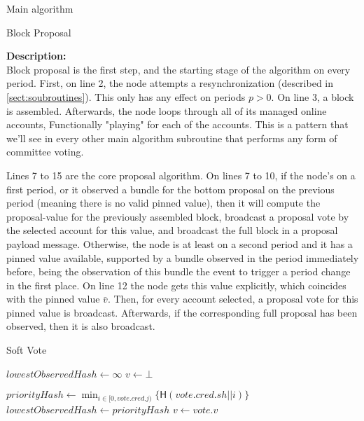 \documentclass[10pt,a4paper]{article}
\begin{document}
\begin{section}{Main algorithm}
\begin{subsection}{Block Proposal}
\newpage

\noindent \textbf{Description:}\\
Block proposal is the first step, and the starting stage of the algorithm on every period.
First, on line 2, the node attempts a resynchronization (described in \ref{sect:soubroutines}). 
This only has any effect on periods $p > 0$. On line 3, a block is assembled.
Afterwards, the node loops through all of its managed online accounts, Functionally
"playing" for each of the accounts. This is a pattern that we'll see in every other
main algorithm subroutine that performs any form of committee voting.

Lines 7 to 15 are the core proposal algorithm. On lines 7 to 10, 
if the node's on a first period, or it observed a bundle for the bottom proposal on the previous 
period (meaning there is no valid pinned value), then it will compute the proposal-value for the 
previously assembled block, broadcast a proposal vote by the selected account for this value, and 
broadcast the full block in a proposal payload message.
Otherwise, the node is at least on a second period and it has a pinned value available, supported by a 
bundle observed in the period immediately before, being the observation of this bundle the event to trigger 
a period change in the first place. On line 12 the node gets this value explicitly, which coincides with the pinned
value $\bar{v}$. 
Then, for every account selected, a proposal vote for this pinned value is broadcast. Afterwards, 
if the corresponding full proposal has been observed, then it is also broadcast.


\end{subsection}
\begin{subsection}{Soft Vote}\label{ssect:softvote}

\begin{algorithm}[H]
    \begin{algorithmic}[1]
    \State $lowestObservedHash \gets \infty$
    \State $v \gets \bot$ 


        \State $priorityHash \gets \min_{i \in [0, vote.cred.j)} \{ \mathsf{H}(vote.cred.sh || i)\}$
            \State $lowestObservedHash \gets priorityHash$
            \State $v \gets vote.v$
        \EndIf    
    \EndFor


\end{algorithmic}
\end{algorithm}
\end{subsection}
\end{section}
\end{document}

